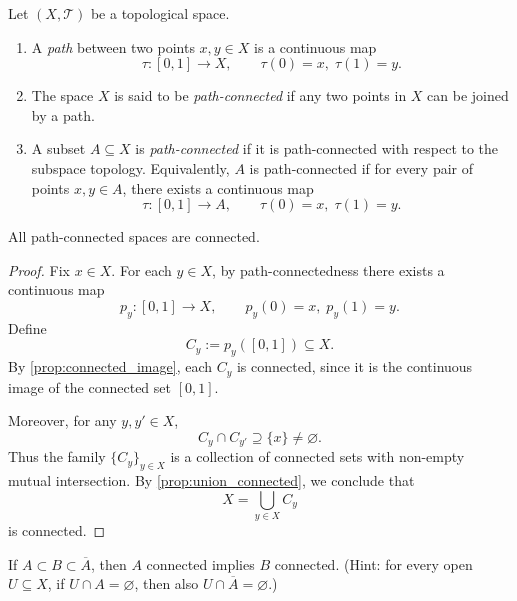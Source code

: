 \begin{definition}\label{def:path_connectedness}
Let $(X, \mathcal{T})$ be a topological space.  

\begin{enumerate}
    \item A \emph{path} between two points \(x,y \in X\) is a continuous map 
    \[
        \tau : [0,1] \to X, \qquad \tau(0) = x,\; \tau(1) = y.
    \]
    
    \item The space \(X\) is said to be \emph{path-connected} if any two points in \(X\) can be joined by a path.
    
    \item A subset \(A \subseteq X\) is \emph{path-connected} if it is path-connected with respect to the subspace topology.  
    Equivalently, \(A\) is path-connected if for every pair of points \(x,y \in A\), there exists a continuous map 
    \[
        \tau : [0,1] \to A, \qquad \tau(0) = x,\; \tau(1) = y.
    \]
\end{enumerate}
\end{definition}

\begin{proposition}\label{prop:path_conn_implies_conn}
All path-connected spaces are connected.
\end{proposition}

\begin{proof}
Fix \(x \in X\). For each \(y \in X\), by path-connectedness there exists a continuous map 
\[
p_y : [0,1] \to X, \qquad p_y(0) = x, \; p_y(1) = y.
\]
Define
\[
C_y := p_y([0,1]) \subseteq X.
\]
By \autoref{prop:connected_image}, each \(C_y\) is connected, since it is the continuous image of the connected set \([0,1]\).  

Moreover, for any \(y,y' \in X\),
\[
C_y \cap C_{y'} \supseteq \{x\} \neq \varnothing.
\]
Thus the family \(\{C_y\}_{y \in X}\) is a collection of connected sets with non-empty mutual intersection. By \autoref{prop:union_connected}, we conclude that
\[
X = \bigcup_{y \in X} C_y
\]
is connected.
\end{proof}

\begin{exercise}
If \(A \subset B \subset \overline{A}\), then \(A\) connected implies \(B\) connected.  
(Hint: for every open \(U \subseteq X\), if \(U \cap A = \varnothing\), then also \(U \cap \overline{A} = \varnothing\).)
\end{exercise}

